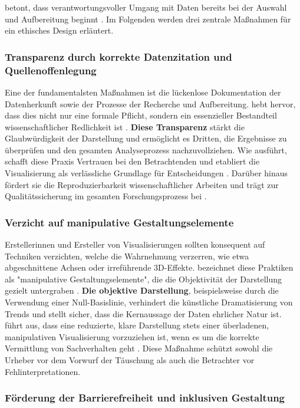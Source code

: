 \citeauthor{2} betont, dass verantwortungsvoller Umgang mit Daten bereits bei der Auswahl und Aufbereitung beginnt \cite[39]{2}. Im Folgenden werden drei zentrale Maßnahmen für ein ethisches Design erläutert.

\subsubsection{Transparenz durch korrekte Datenzitation und Quellenoffenlegung}

Eine der fundamentalsten Maßnahmen ist die lückenlose Dokumentation der Datenherkunft sowie der Prozesse der Recherche und Aufbereitung. \citeauthor{2} hebt hervor, dass dies nicht nur eine formale Pflicht, sondern ein essenzieller Bestandteil wissenschaftlicher Redlichkeit ist \cite[11, 40]{2}. \textbf{Diese Transparenz} stärkt die Glaubwürdigkeit der Darstellung und ermöglicht es Dritten, die Ergebnisse zu überprüfen und den gesamten Analyseprozess nachzuvollziehen. Wie \citeauthor{2} ausführt, schafft diese Praxis Vertrauen bei den Betrachtenden und etabliert die Visualisierung als verlässliche Grundlage für Entscheidungen \cite[10]{2}. Darüber hinaus fördert sie die Reproduzierbarkeit wissenschaftlicher Arbeiten und trägt zur Qualitätssicherung im gesamten Forschungsprozess bei \cite[40]{2}.

\subsubsection{Verzicht auf manipulative Gestaltungselemente}

Erstellerinnen und Ersteller von Visualisierungen sollten konsequent auf Techniken verzichten, welche die Wahrnehmung verzerren, wie etwa abgeschnittene Achsen oder irreführende 3D-Effekte. \citeauthor{2} bezeichnet diese Praktiken als "manipulative Gestaltungselemente", die die Objektivität der Darstellung gezielt untergraben \cite[39]{2}. \textbf{Die objektive Darstellung}, beispielsweise durch die Verwendung einer Null-Basislinie, verhindert die künstliche Dramatisierung von Trends und stellt sicher, dass die Kernaussage der Daten ehrlicher Natur ist. \citeauthor{2} führt aus, dass eine reduzierte, klare Darstellung stets einer überladenen, manipulativen Visualisierung vorzuziehen ist, wenn es um die korrekte Vermittlung von Sachverhalten geht \cite[39, 44]{2}. Diese Maßnahme schützt sowohl die Urheber vor dem Vorwurf der Täuschung als auch die Betrachter vor Fehlinterpretationen.

\subsubsection{Förderung der Barrierefreiheit und inklusiven Gestaltung}


